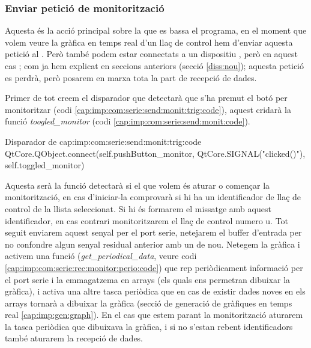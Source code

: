 \subsubsection{Enviar petició de monitorització}\label{cap:imp:com:serie:send:monit}

Aquesta és la acció principal sobre la que es bassa el programa, en el moment que volem veure la gràfica en temps real d'un llaç de control hem d'enviar aquesta petició al \Monitor. Però també podem estar connectats a un dispositiu \SensorActuador, però en aquest cas ; com ja hem explicat en seccions anteriors (secció \ref{diss:nou}); aquesta petició es perdrà, però posarem en marxa tota la part de recepció de dades.

Primer de tot creem el disparador que detectarà que s'ha premut el botó per monitoritzar (codi \ref{cap:imp:com:serie:send:monit:trig:code}), aquest cridarà la funció \emph{toogled\_monitor} (codi \ref{cap:imp:com:serie:send:monit:code}).

\begin{code_python}{Disparador de }{cap:imp:com:serie:send:monit:trig:code}
QtCore.QObject.connect(self.pushButton_monitor, QtCore.SIGNAL("clicked()"), self.toggled_monitor)
\end{code_python}

Aquesta serà la funció detectarà si el que volem és aturar o començar la monitorització, en cas d'iniciar-la comprovarà si hi ha un identificador de llaç de control de la llista seleccionat. Si hi és formarem el missatge amb aquest identificador, en cas contrari monitoritzarem el llaç de control numero u. Tot seguit enviarem aquest senyal per el port serie, netejarem el buffer d'entrada per no confondre algun senyal residual anterior amb un de nou. Netegem la gràfica i activem una funció (\emph{get\_periodical\_data}, veure codi \ref{cap:imp:com:serie:rec:monitor:perio:code}) que rep periòdicament informació per el port serie i la emmagatzema en arrays (els quals ens permetran dibuixar la gràfica), i activa una altre tasca periòdica que en cas de existir dades noves en els arrays tornarà a dibuixar la gràfica (secció de generació de gràfiques en temps real \ref{cap:imp:gen:graph}).
En el cas que estem parant la monitorització aturarem la tasca periòdica que dibuixava la gràfica, i si no s'estan rebent identificadors també aturarem la recepció de dades.


